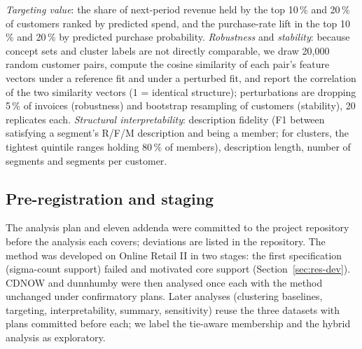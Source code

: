 \textit{Targeting value}: the share of next-period revenue held by the top 10\,\% and 20\,\% of customers ranked by predicted spend, and the purchase-rate lift in the top 10\,\% and 20\,\% by predicted purchase probability. \textit{Robustness} and \textit{stability}: because concept sets and cluster labels are not directly comparable, we draw 20,000 random customer pairs, compute the cosine similarity of each pair's feature vectors under a reference fit and under a perturbed fit, and report the correlation of the two similarity vectors (1 = identical structure); perturbations are dropping 5\,\% of invoices (robustness) and bootstrap resampling of customers (stability), 20 replicates each. \textit{Structural interpretability}: description fidelity (F1 between satisfying a segment's R/F/M description and being a member; for clusters, the tightest quintile ranges holding 80\,\% of members), description length, number of segments and segments per customer.

\subsection{Pre-registration and staging}\label{sec:prereg}

The analysis plan and eleven addenda were committed to the project repository before the analysis each covers; deviations are listed in the repository. The method was developed on Online Retail II in two stages: the first specification (sigma-count support) failed and motivated core support (Section~\ref{sec:res-dev}). CDNOW and dunnhumby were then analysed once each with the method unchanged under confirmatory plans. Later analyses (clustering baselines, targeting, interpretability, summary, sensitivity) reuse the three datasets with plans committed before each; we label the tie-aware membership and the hybrid analysis as exploratory.
